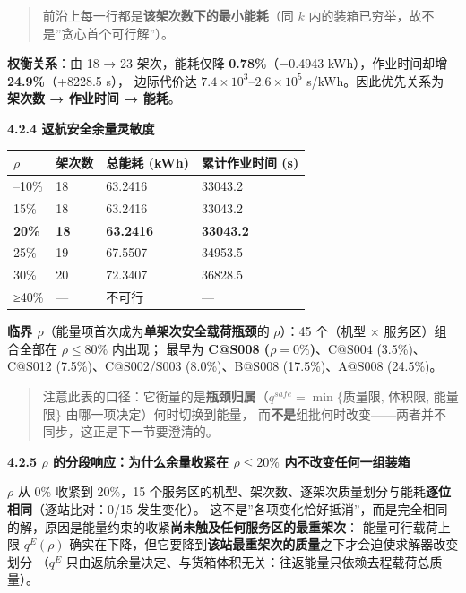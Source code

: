 \documentclass[
  10.5pt,
]{extarticle}
\newcounter{none} %
\begin{document}
\begin{quote}
前沿上每一行都是\textbf{该架次数下的最小能耗}（同 \(k\)
内的装箱已穷举，故不是''贪心首个可行解''）。
\end{quote}

\textbf{权衡关系}：由 18 → 23 架次，能耗仅降 \textbf{0.78\%}（−0.4943
kWh），作业时间却增 \textbf{24.9\%}（+8228.5 s）， 边际代价达
\(7.4\times10^3\)--\(2.6\times10^5\) s/kWh。因此优先关系为
\textbf{架次数 → 作业时间 → 能耗}。

\textbf{4.2.4 返航安全余量灵敏度}

{\def\LTcaptype{none} %
\begin{longtable}[]{@{}llll@{}}
\toprule\noalign{}
\(\rho\) & 架次数 & 总能耗 (kWh) & 累计作业时间 (s) \\
\midrule\noalign{}
\endhead
\bottomrule\noalign{}
\endlastfoot
0--10\% & 18 & 63.2416 & 33043.2 \\
15\% & 18 & 63.2416 & 33043.2 \\
\textbf{20\%} & \textbf{18} & \textbf{63.2416} & \textbf{33043.2} \\
25\% & 19 & 67.5507 & 34953.5 \\
30\% & 20 & 72.3407 & 36828.5 \\
≥40\% & --- & 不可行 & --- \\
\end{longtable}
}

\textbf{临界 \(\rho\)}（能量项首次成为\textbf{单架次安全载荷瓶颈}的
\(\rho\)）：45 个（机型 × 服务区）组合全部在 \(\rho\le80\%\) 内出现；
最早为 \textbf{C@S008 (\(\rho=0\%\))}、C@S004 (3.5\%)、C@S012
(7.5\%)、C@S002/S003 (8.0\%)、B@S008 (17.5\%)、A@S008 (24.5\%)。

\begin{quote}
注意此表的口径：它衡量的是\textbf{瓶颈归属}（\(q^{safe}=\min\{\)质量限,
体积限, 能量限\(\}\) 由哪一项决定）何时切换到能量，
而\textbf{不是}组批何时改变------两者并不同步，这正是下一节要澄清的。
\end{quote}

\textbf{4.2.5 \(\rho\) 的分段响应：为什么余量收紧在 \(\rho\le20\%\)
内不改变任何一组装箱}

\(\rho\) 从 0\% 收紧到 20\%，15
个服务区的机型、架次数、逐架次质量划分与能耗\textbf{逐位相同}（逐站比对：0/15
发生变化）。
这不是''各项变化恰好抵消''，而是完全相同的解，原因是能量约束的收紧\textbf{尚未触及任何服务区的最重架次}：
能量可行载荷上限 \(q^E(\rho)\)
确实在下降，但它要降到\textbf{该站最重架次的质量}之下才会迫使求解器改变划分
（\(q^E\)
只由返航余量决定、与货箱体积无关：往返能量只依赖去程载荷总质量）。
\end{document}
